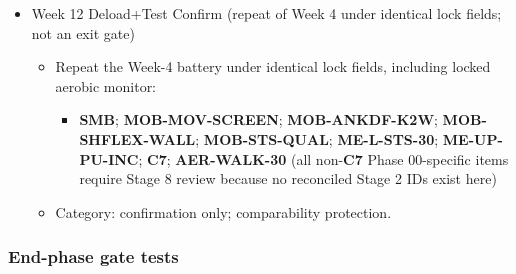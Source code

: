 \documentclass[10pt]{article}
\begin{document}
\begin{itemize}
\item Week 12 Deload+Test Confirm (repeat of Week 4 under identical lock fields; not an exit gate)
  \begin{itemize}
  \item Repeat the Week-4 battery under identical lock fields, including locked aerobic monitor:
    \begin{itemize}
    \item \textbf{SMB}; \textbf{MOB-MOV-SCREEN}; \textbf{MOB-ANKDF-K2W}; \textbf{MOB-SHFLEX-WALL}; \textbf{MOB-STS-QUAL}; \textbf{ME-L-STS-30}; \textbf{ME-UP-PU-INC}; \textbf{C7}; \textbf{AER-WALK-30} (all non-\textbf{C7} Phase 00-specific items require Stage 8 review because no reconciled Stage 2 IDs exist here)
    \end{itemize}
  \item Category: confirmation only; comparability protection.
  \end{itemize}
\end{itemize}

\subsubsection*{End-phase gate tests}
\end{document}
